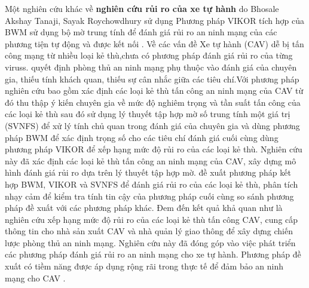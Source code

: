 Một nghiên cứu khác về \textbf{nghiên cứu rủi ro của xe tự hành} do Bhosale Akshay Tanaji, Sayak Roychowdhury sử dụng Phương pháp VIKOR tích hợp của BWM sử dụng bộ mờ trung tính để đánh giá rủi ro an ninh mạng của các phương tiện tự động và được kết nối \cite{sciencedirect2}. Về các vấn đề Xe tự hành (CAV) dễ bị tấn công mạng từ nhiều loại kẻ thù,chưa có phương pháp đánh giá rủi ro của từng viruss. quyết định phòng thủ an ninh mạng phụ thuộc vào đánh giá của chuyên gia, thiếu tính khách quan, thiếu sự cân nhắc giữa các tiêu chí.Với phương pháp nghiên cứu bao gồm xác định các loại kẻ thù tấn công an ninh mạng của CAV từ đó thu thập ý kiến chuyên gia về mức độ nghiêm trọng và tần suất tấn công của các loại kẻ thù sau đó sử dụng lý thuyết tập hợp mờ số trung tính một giá trị (SVNFS) để xử lý tính chủ quan trong đánh giá của chuyên gia và dùng phương pháp BWM để xác định trọng số cho các tiêu chí đánh giá cuối cùng dùng phương pháp VIKOR để xếp hạng mức độ rủi ro của các loại kẻ thù. Nghiên cứu này đã xác định các loại kẻ thù tấn công an ninh mạng của CAV, xây dựng mô hình đánh giá rủi ro dựa trên lý thuyết tập hợp mờ. đề xuất phương pháp kết hợp BWM, VIKOR và SVNFS để đánh giá rủi ro của các loại kẻ thù, phân tích nhạy cảm để kiểm tra tính tin cậy của phương pháp cuối cùng so sánh phương pháp đề xuất với các phương pháp khác. Đem đến kết quả khả quan như là nghiên cứu xếp hạng mức độ rủi ro của các loại kẻ thù tấn công CAV, cung cấp thông tin cho nhà sản xuất CAV và nhà quản lý giao thông để xây dựng chiến lược phòng thủ an ninh mạng. Nghiên cứu này đã đóng góp vào việc phát triển các phương pháp đánh giá rủi ro an ninh mạng cho xe tự hành. Phương pháp đề xuất có tiềm năng được áp dụng rộng rãi trong thực tế để đảm bảo an ninh mạng cho CAV .

